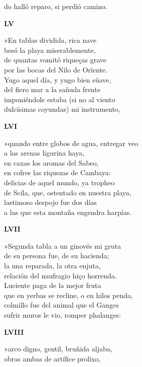\documentclass[11pt,twoside]{article}
\begin{document}
do halló reparo, si perdió camino.\par\poend
%
\begin{center}
	\textbf{LV}
\end{center}\postart
»En tablas dividida, rica nave\\
besó la playa miserablemente,\\
de quantas vomitó riqueças grave\\
por las bocas del Nilo de Orïente.\\
Yugo aquel día, y yugo bien süave,\\
del fiero mar a la sañuda frente\\
imponiéndole estaba (si no al viento\\
dulcísimas coyundas) mi instrumento,\par\poend
%
\begin{center}
	\textbf{LVI}
\end{center}\postart
»quando entre globos de agua, entregar veo\\
a las arenas ligurina haya,\\
en caxas los aromas del Sabeo,\\
en cofres las riquezas de Cambaya:\\
delicias de aquel mundo, ya tropheo\\
de Scila, que, ostentado en nuestra playa,\\
lastimoso despojo fue dos días\\
a las que esta montaña engendra harpías.\par\poend
%
\begin{center}
	\textbf{LVII}
\end{center}\postart
»Segunda tabla a un ginovés mi gruta\\
de su persona fue, de su hacienda;\\
la una reparada, la otra enjuta,\\
relación del naufragio hiço horrenda.\\
Luciente paga de la mejor fruta\\
que en yerbas se recline, o en hilos penda,\\
colmillo fue del animal que el Ganges\\
sufrir muros le vio, romper phalanges:\par\poend
%
\begin{center}
	\textbf{LVIII}
\end{center}\postart
»arco digno, gentil, bruñida aljaba,\\
obras ambas de artífice prolixo,\\
\end{document}
